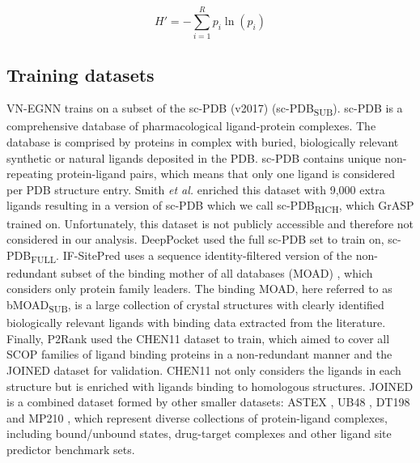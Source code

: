 \begin{equation}
H' = - \sum_{i=1}^{R} p_i \ln(p_i)
\label{eq:entropy_shannon}
\end{equation}

\subsection{Training datasets}

VN-EGNN trains on a subset \cite{KANDEL_2021_PURESNET} of the sc-PDB (v2017) \cite{PAUL_2004_SCPDB, KELLENBERGER_2006_SCPDB, MESLAMANI_2011_SCPDB, DESAPHY_2015_SCPDB} (sc-PDB\textsubscript{SUB}). sc-PDB is a comprehensive database of pharmacological ligand-protein complexes. The database is comprised by proteins in complex with buried, biologically relevant synthetic or natural ligands deposited in the PDB. sc-PDB contains unique non-repeating protein-ligand pairs, which means that only one ligand is considered per PDB structure entry. Smith \textit{et al.} \cite{SMITH_2024_GrASP} enriched this dataset with 9,000 extra ligands resulting in a version of sc-PDB which we call sc-PDB\textsubscript{RICH}, which GrASP trained on. Unfortunately, this dataset is not publicly accessible and therefore not considered in our analysis. DeepPocket used the full sc-PDB set to train on, sc-PDB\textsubscript{FULL}. IF-SitePred uses a sequence identity-filtered version of the non-redundant subset of the binding mother of all databases (MOAD) \cite{HU_2005_BMOAD, BENSON_2008_BMOAD, AHMED_2015_BMOAD, SMITH_2019_BMOAD}, which considers only protein family leaders. The binding MOAD, here referred to as bMOAD\textsubscript{SUB}, is a large collection of crystal structures with clearly identified biologically relevant ligands with binding data extracted from the literature. Finally, P2Rank used the CHEN11 dataset to train, which aimed to cover all SCOP \cite{HUBBARD_1997_SCOP, HUBBARD_1998_SCOP, LOCONTE_2000_SCOP} families of ligand binding proteins in a non-redundant manner \cite{CHEN_2011_ASSESSMENT} and the JOINED dataset for validation. CHEN11 not only considers the ligands in each structure but is enriched with ligands binding to homologous structures. JOINED is a combined dataset formed by other smaller datasets: ASTEX \cite{HARTSHORN_2007_ASTEX}, UB48 \cite{HUANG_2006_BU48}, DT198 \cite{ZHANG_2011_METAPOCKET} and MP210 \cite{HUANG_2009_METAPOCKET}, which represent diverse collections of protein-ligand complexes, including bound/unbound states, drug-target complexes and other ligand site predictor benchmark sets.

